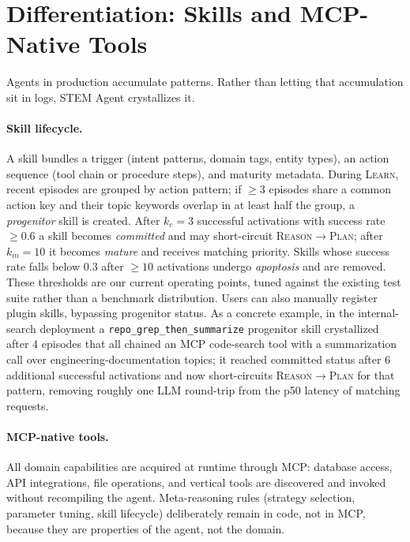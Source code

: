 \documentclass[11pt]{article}
\begin{document}
\section{Differentiation: Skills and MCP-Native Tools}
\label{sec:skills}

Agents in production accumulate patterns. Rather than letting that accumulation sit in logs, STEM Agent crystallizes it.

\paragraph{Skill lifecycle.} A skill bundles a trigger (intent patterns, domain tags, entity types), an action sequence (tool chain or procedure steps), and maturity metadata. During \textsc{Learn}, recent episodes are grouped by action pattern; if $\geq 3$ episodes share a common action key and their topic keywords overlap in at least half the group, a \emph{progenitor} skill is created. After $k_c{=}3$ successful activations with success rate $\geq 0.6$ a skill becomes \emph{committed} and may short-circuit \textsc{Reason}$\to$\textsc{Plan}; after $k_m{=}10$ it becomes \emph{mature} and receives matching priority. Skills whose success rate falls below $0.3$ after $\geq 10$ activations undergo \emph{apoptosis} and are removed. These thresholds are our current operating points, tuned against the existing test suite rather than a benchmark distribution. Users can also manually register plugin skills, bypassing progenitor status. As a concrete example, in the internal-search deployment a \texttt{repo\_grep\_then\_summarize} progenitor skill crystallized after 4 episodes that all chained an MCP code-search tool with a summarization call over engineering-documentation topics; it reached committed status after 6 additional successful activations and now short-circuits \textsc{Reason}$\to$\textsc{Plan} for that pattern, removing roughly one LLM round-trip from the p50 latency of matching requests.

\paragraph{MCP-native tools.} All domain capabilities are acquired at runtime through MCP: database access, API integrations, file operations, and vertical tools are discovered and invoked without recompiling the agent. Meta-reasoning rules (strategy selection, parameter tuning, skill lifecycle) deliberately remain in code, not in MCP, because they are properties of the agent, not the domain.
\end{document}

